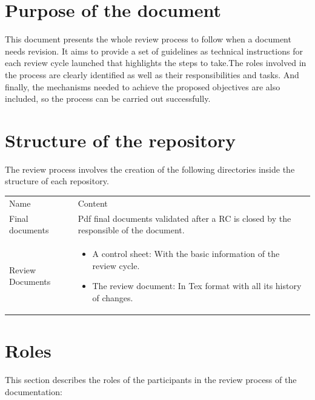 \documentclass{template/openetcs_article}
\begin{document}
\newpage

\section[Introduction]{Purpose of the document}
This document presents the whole review process to follow when a document needs revision. It aims to provide a set of guidelines as technical instructions for each review cycle launched that highlights the steps to take.The roles involved in the process are clearly identified as well as their responsibilities and tasks. And finally, the mechanisms needed to achieve the proposed objectives are also included, so the process can be carried out successfully.

\section{Structure of the repository}
 
The review process involves the creation of the following directories inside the structure of each repository. 

\begin{flushleft}

\begin{tabular}{|m{3cm}|m{11cm}|}
\hline
\rowcolor{myblue}
\multicolumn{2}{|c|}{Structure of the repository} \\\hline
\rowcolor{lightgray}
Name &
Content 
\\\hline
Final documents &
Pdf final documents validated after a RC is closed by the responsible of the document.\\\hline
Review Documents &
\begin{itemize}
\item A control sheet: With the basic information of the review cycle.
\item The review document: In Tex format with all its history of changes.
\end{itemize}\\\hline
\end{tabular}
\end{flushleft}

\section{Roles}


This section describes  the roles of the participants in the review process of the documentation:
\end{document}
